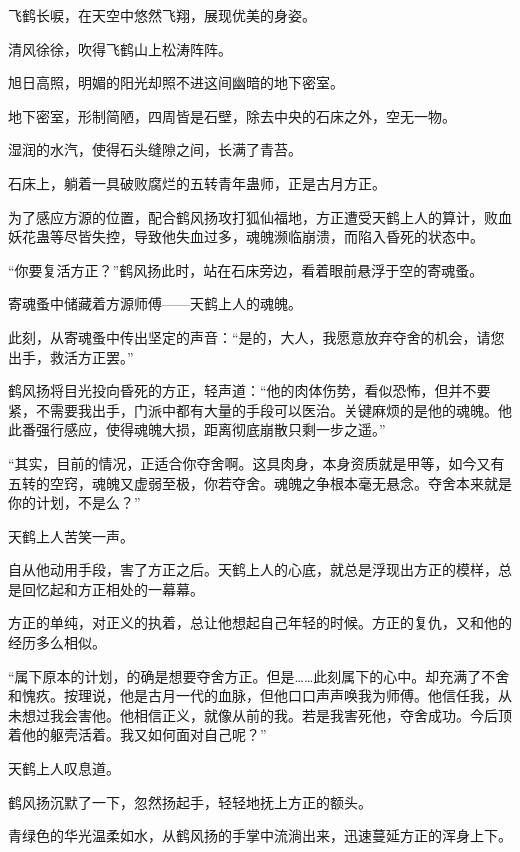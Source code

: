 
\begin{this_body}

飞鹤长唳，在天空中悠然飞翔，展现优美的身姿。

清风徐徐，吹得飞鹤山上松涛阵阵。

旭日高照，明媚的阳光却照不进这间幽暗的地下密室。

地下密室，形制简陋，四周皆是石壁，除去中央的石床之外，空无一物。

湿润的水汽，使得石头缝隙之间，长满了青苔。

石床上，躺着一具破败腐烂的五转青年蛊师，正是古月方正。

为了感应方源的位置，配合鹤风扬攻打狐仙福地，方正遭受天鹤上人的算计，败血妖花蛊等尽皆失控，导致他失血过多，魂魄濒临崩溃，而陷入昏死的状态中。

“你要复活方正？”鹤风扬此时，站在石床旁边，看着眼前悬浮于空的寄魂蚤。

寄魂蚤中储藏着方源师傅——天鹤上人的魂魄。

此刻，从寄魂蚤中传出坚定的声音：“是的，大人，我愿意放弃夺舍的机会，请您出手，救活方正罢。”

鹤风扬将目光投向昏死的方正，轻声道：“他的肉体伤势，看似恐怖，但并不要紧，不需要我出手，门派中都有大量的手段可以医治。关键麻烦的是他的魂魄。他此番强行感应，使得魂魄大损，距离彻底崩散只剩一步之遥。”

“其实，目前的情况，正适合你夺舍啊。这具肉身，本身资质就是甲等，如今又有五转的空窍，魂魄又虚弱至极，你若夺舍。魂魄之争根本毫无悬念。夺舍本来就是你的计划，不是么？”

天鹤上人苦笑一声。

自从他动用手段，害了方正之后。天鹤上人的心底，就总是浮现出方正的模样，总是回忆起和方正相处的一幕幕。

方正的单纯，对正义的执着，总让他想起自己年轻的时候。方正的复仇，又和他的经历多么相似。

“属下原本的计划，的确是想要夺舍方正。但是……此刻属下的心中。却充满了不舍和愧疚。按理说，他是古月一代的血脉，但他口口声声唤我为师傅。他信任我，从未想过我会害他。他相信正义，就像从前的我。若是我害死他，夺舍成功。今后顶着他的躯壳活着。我又如何面对自己呢？”

天鹤上人叹息道。

鹤风扬沉默了一下，忽然扬起手，轻轻地抚上方正的额头。

青绿色的华光温柔如水，从鹤风扬的手掌中流淌出来，迅速蔓延方正的浑身上下。


\end{this_body}
